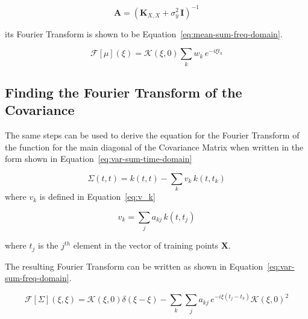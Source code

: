 \documentclass[12pt]{article}
\begin{document}
    \begin{equation}
         \mathbf{A} = (\mathbf{K}_{X,X} + \sigma^2_y \, \mathbf{I})^{-1} \label{eq:A}
    \end{equation}

    \noindent its Fourier Transform is shown to be Equation~\ref{eq:mean-sum-freq-domain}.

    \begin{equation}
        \mathcal{F}[{\mu}](\xi) = \mathcal{K}(\xi,0) \sum_k w_k \, e^{- i \xi t_k} \label{eq:mean-sum-freq-domain}
    \end{equation}

    \subsection{Finding the Fourier Transform of the Covariance}

    The same steps can be used to derive the equation for the Fourier Transform of the function for the main diagonal of the Covariance Matrix when written in the form shown in Equation~\ref{eq:var-sum-time-domain}

    \begin{equation}
        \Sigma(t, t) = k(t,t) - \sum_k v_k \, k(t,t_k) \label{eq:var-sum-time-domain}
    \end{equation}
    \noindent where $v_k$ is defined in Equation~\ref{eq:v_k}

    \begin{equation}
        v_k = \sum_j a_{kj} \, k(t,t_j) \label{eq:v_k}
    \end{equation}

    \noindent where $t_j$ is the $j^{th}$ element in the vector of training points $\mathbf{X}$.

    The resulting Fourier Transform can be written as shown in Equation~\ref{eq:var-sum-freq-domain}.


    \begin{equation}
        \mathcal{F}[\Sigma](\xi, \xi) = \mathcal{K}(\xi,0) \delta(\xi - \xi)  - \sum_k \sum_j a_{kj} \, e^{-i \xi (t_j - t_k)} \mathcal{K}(\xi,0)^2 \label{eq:var-sum-freq-domain}
    \end{equation}
\end{document}
